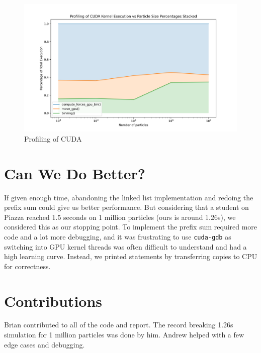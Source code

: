 \documentclass{article}
\begin{document}
\begin{figure}[H]
	\centerline{\includegraphics[width=6in]{figures/profiling-stacked-percentage.png}}
	\caption{Profiling of CUDA}
	\label{fig:profile-stacked-percentage}
\end{figure}

\section{Can We Do Better?}
If given enough time, abandoning the linked list implementation and redoing the prefix sum could give us better performance. But considering that a student on Piazza reached 1.5 seconds on 1 million particles (ours is around 1.26s), we considered this as our stopping point. To implement the prefix sum required more code and a lot more debugging, and it was frustrating to use \verb|cuda-gdb| as switching into GPU kernel threads was often difficult to understand and had a high learning curve. Instead, we printed statements by transferring copies to CPU for correctness.

\section{Contributions}
Brian contributed to all of the code and report. The record breaking 1.26s simulation for 1 million particles was done by him. Andrew helped with a few edge cases and debugging.
\end{document}
